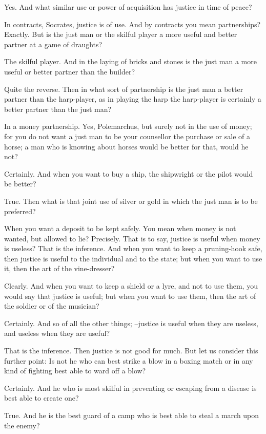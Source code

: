 Yes.
And what similar use or power of acquisition has justice in time of peace?

In contracts, Socrates, justice is of use.
And by contracts you mean partnerships?
Exactly.
But is the just man or the skilful player a more useful and better partner at a game of draughts?

The skilful player.
And in the laying of bricks and stones is the just man a more useful or better partner than the builder?

Quite the reverse.
Then in what sort of partnership is the just man a better partner than the harp-player, as in playing the harp the harp-player is certainly a better partner than the just man?

In a money partnership.
Yes, Polemarchus, but surely not in the use of money; for you do not want a just man to be your counsellor the purchase or sale of a horse; a man who is knowing about horses would be better for that, would he not?

Certainly.
And when you want to buy a ship, the shipwright or the pilot would be better?

True.
Then what is that joint use of silver or gold in which the just man is to be preferred?

When you want a deposit to be kept safely.
You mean when money is not wanted, but allowed to lie?
Precisely.
That is to say, justice is useful when money is useless?
That is the inference.
And when you want to keep a pruning-hook safe, then justice is useful to the individual and to the state; but when you want to use it, then the art of the vine-dresser?

Clearly.
And when you want to keep a shield or a lyre, and not to use them, you would say that justice is useful; but when you want to use them, then the art of the soldier or of the musician?

Certainly.
And so of all the other things; --justice is useful when they are useless, and useless when they are useful?

That is the inference.
Then justice is not good for much. But let us consider this further point: Is not he who can best strike a blow in a boxing match or in any kind of fighting best able to ward off a blow?

Certainly.
And he who is most skilful in preventing or escaping from a disease is best able to create one?

True.
And he is the best guard of a camp who is best able to steal a march upon the enemy?

